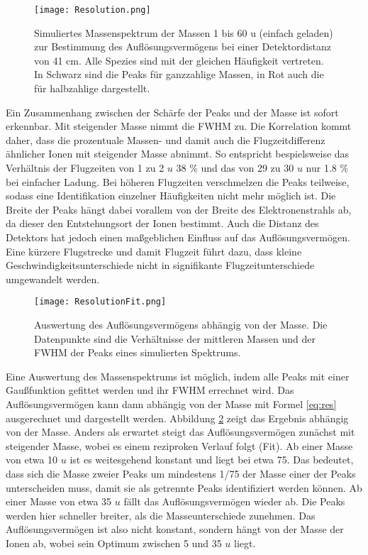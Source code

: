 \begin{figure}
    \centering
    \texttt{[image: Resolution.png]}
    \caption[Simuliertes Massenspektrum (1–60 u, 410 mm) zur Auflösungsbestimmung]{Simuliertes Massenspektrum der Massen 1 bis 60 u (einfach geladen) zur Bestimmung des Auflösungsvermögens bei einer Detektordistanz von 41 cm. Alle Spezies sind mit der gleichen Häufigkeit vertreten. In Schwarz sind die Peaks für ganzzahlige Massen, in Rot auch die für halbzahlige dargestellt.}
    \label{fig:res}
\end{figure}

Ein Zusammenhang zwischen der Schärfe der Peaks und der Masse ist sofort erkennbar. Mit steigender Masse nimmt die FWHM zu. Die Korrelation kommt daher, dass die prozentuale Massen- und damit auch die Flugzeitdifferenz ähnlicher Ionen mit steigender Masse abnimmt. So entspricht bespielsweise das Verhältnis der Flugzeiten von 1 zu 2 $u$ 38 \% und das von 29 zu 30 $u$ nur 1.8 \% bei einfacher Ladung. Bei höheren Flugzeiten verschmelzen die Peaks teilweise, sodass eine Identifikation einzelner Häufigkeiten nicht mehr möglich ist. Die Breite der Peaks hängt dabei vorallem von der Breite des Elektronenstrahls ab, da dieser den Entstehungsort der Ionen bestimmt. Auch die Distanz des Detektors hat jedoch einen maßgeblichen Einfluss auf das Auflösungsvermögen. Eine kürzere Flugstrecke und damit Flugzeit führt dazu, dass kleine Geschwindigkeitsunterschiede nicht in signifikante Flugzeitunterschiede umgewandelt werden.

\begin{figure}
    \centering
    \texttt{[image: ResolutionFit.png]}
    \caption[Auswertung des Auflösungsvermögens abhängig von der Masse (410 mm)]{Auswertung des Auflösungsvermögens abhängig von der Masse. Die Datenpunkte sind die Verhältnisse der mittleren Massen und der FWHM der Peaks eines simulierten Spektrums.}
    \label{fig:res_fit}
\end{figure}

Eine Auswertung des Massenspektrums ist möglich, indem alle Peaks mit einer Gaußfunktion gefittet werden und ihr FWHM errechnet wird. Das Auflösungsvermögen kann dann abhängig von der Masse mit Formel \ref{eq:res} ausgerechnet und dargestellt werden. Abbildung \ref{fig:res_fit} zeigt das Ergebnis abhängig von der Masse. Anders als erwartet steigt das Auflösungsvermögen zunächst mit steigender Masse, wobei es einem reziproken Verlauf folgt (Fit). Ab einer Masse von etwa 10 $u$ ist es weitesgehend konstant und liegt bei etwa 75. Das bedeutet, dass sich die Masse zweier Peaks um mindestens 1/75 der Masse einer der Peaks unterscheiden muss, damit sie als getrennte Peaks identifiziert werden können. Ab einer Masse von etwa 35 $u$ fällt das Auflösungsvermögen wieder ab. Die Peaks werden hier schneller breiter, als die Masseunterschiede zunehmen. Das Auflösungsvermögen ist also nicht konstant, sondern hängt von der Masse der Ionen ab, wobei sein Optimum zwischen 5 und 35 $u$ liegt.

